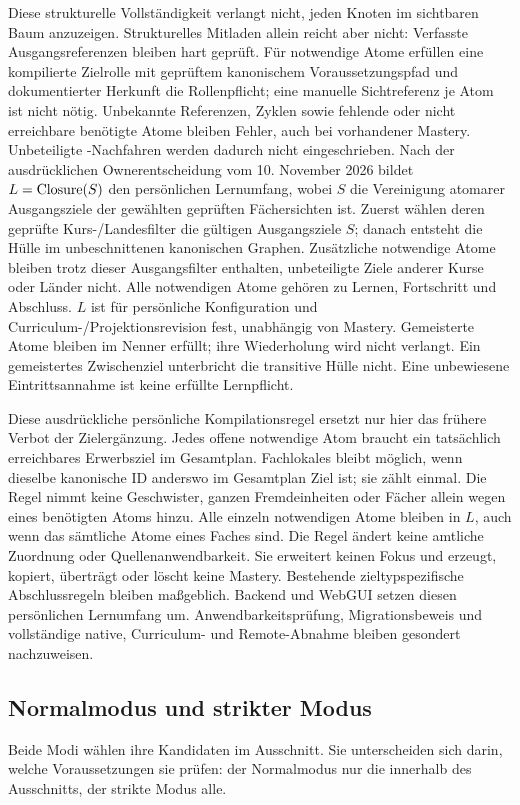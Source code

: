 Diese strukturelle Vollständigkeit verlangt nicht, jeden Knoten im
sichtbaren Baum anzuzeigen. Strukturelles Mitladen allein reicht aber
nicht: Verfasste Ausgangsreferenzen bleiben hart geprüft. Für notwendige
Atome erfüllen eine kompilierte Zielrolle mit geprüftem kanonischem
Voraussetzungspfad und dokumentierter Herkunft die Rollenpflicht;
eine manuelle Sichtreferenz je Atom ist nicht nötig. Unbekannte Referenzen,
Zyklen sowie fehlende oder nicht erreichbare benötigte Atome bleiben Fehler,
auch bei vorhandener Mastery. Unbeteiligte -Nachfahren
werden dadurch nicht eingeschrieben.
Nach der ausdrücklichen Ownerentscheidung vom 10. November 2026 bildet
$L=\operatorname{Closure}(S)$ den persönlichen Lernumfang, wobei $S$ die Vereinigung
atomarer Ausgangsziele der gewählten geprüften Fächersichten ist.
Zuerst wählen deren geprüfte Kurs-/Landesfilter die gültigen Ausgangsziele
$S$; danach entsteht die Hülle im unbeschnittenen kanonischen Graphen.
Zusätzliche notwendige Atome bleiben trotz dieser Ausgangsfilter enthalten,
unbeteiligte Ziele anderer Kurse oder Länder nicht. Alle notwendigen Atome
gehören zu Lernen, Fortschritt und Abschluss. $L$ ist
für persönliche Konfiguration und Curriculum-/Projektionsrevision fest,
unabhängig von Mastery. Gemeisterte Atome bleiben im Nenner erfüllt;
ihre Wiederholung wird nicht verlangt. Ein gemeistertes Zwischenziel
unterbricht die transitive Hülle nicht. Eine unbewiesene Eintrittsannahme
ist keine erfüllte Lernpflicht.

Diese ausdrückliche persönliche Kompilationsregel ersetzt nur hier das
frühere Verbot der Zielergänzung. Jedes offene notwendige Atom braucht
ein tatsächlich erreichbares Erwerbsziel im Gesamtplan. Fachlokales
 bleibt möglich, wenn dieselbe kanonische ID
anderswo im Gesamtplan Ziel ist; sie zählt einmal. Die Regel nimmt keine
Geschwister, ganzen Fremdeinheiten oder Fächer allein wegen eines
benötigten Atoms hinzu. Alle einzeln notwendigen Atome bleiben in $L$,
auch wenn das sämtliche Atome eines Faches sind. Die Regel ändert keine
amtliche Zuordnung oder Quellenanwendbarkeit.
Sie erweitert keinen Fokus und erzeugt, kopiert, überträgt oder löscht
keine Mastery. Bestehende zieltypspezifische Abschlussregeln bleiben
maßgeblich. Backend und WebGUI setzen diesen persönlichen Lernumfang um.
Anwendbarkeitsprüfung, Migrationsbeweis und vollständige native,
Curriculum- und Remote-Abnahme bleiben gesondert nachzuweisen.

\subsection{Normalmodus und strikter Modus}
\label{sec:filter-modes}
Beide Modi wählen ihre Kandidaten im Ausschnitt. Sie unterscheiden sich
darin, welche Voraussetzungen sie prüfen: der Normalmodus nur die
innerhalb des Ausschnitts, der strikte Modus alle.

